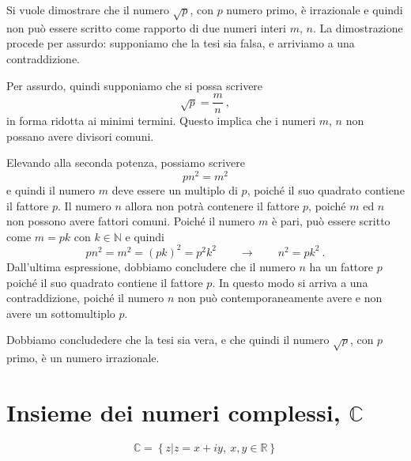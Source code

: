 \begin{example} Si vuole dimostrare che il numero $\sqrt{p}$, con $p$ numero primo, è irrazionale e quindi non può essere scritto come rapporto di due numeri interi $m$, $n$. La dimostrazione procede per assurdo: supponiamo che la tesi sia falsa, e arriviamo a una contraddizione.

Per assurdo, quindi supponiamo che si possa scrivere
\begin{equation}
\sqrt{p} = \dfrac{m}{n} \ ,
\end{equation}
in forma ridotta ai minimi termini. Questo implica che i numeri $m$, $n$ non possano avere divisori comuni.

Elevando alla seconda potenza, possiamo scrivere
\begin{equation}
  p n^2 = m^2
\end{equation}
e quindi il numero $m$ deve essere un multiplo di $p$, poiché il suo quadrato contiene il fattore $p$. Il numero $n$ allora non potrà contenere il fattore $p$, poiché $m$ ed $n$ non possono avere fattori comuni.
Poiché il numero $m$ è pari, può essere scritto come $m = p k$ con $k \in \mathbb{N}$ e quindi
\begin{equation}
  p n^2 = m^2 = (pk)^2 = p^2 k^2 \qquad \rightarrow \qquad n^2 = p k^2 \ .
\end{equation}
Dall'ultima espressione, dobbiamo concludere che il numero $n$ ha un fattore $p$ poiché il suo quadrato contiene  il fattore $p$. In questo modo si arriva a una contraddizione, poiché il numero $n$ non può contemporaneamente avere e non avere un sottomultiplo $p$.

Dobbiamo concludedere che la tesi sia vera, e che quindi il numero $\sqrt{p}$, con $p$ primo, è un numero irrazionale.
\end{example}

\section{Insieme dei numeri complessi, $\mathbb{C}$}
\begin{equation}
    \mathbb{C} = \left\{ z | z = x + i y, \ x, y \in \mathbb{R} \right\}
\end{equation}



